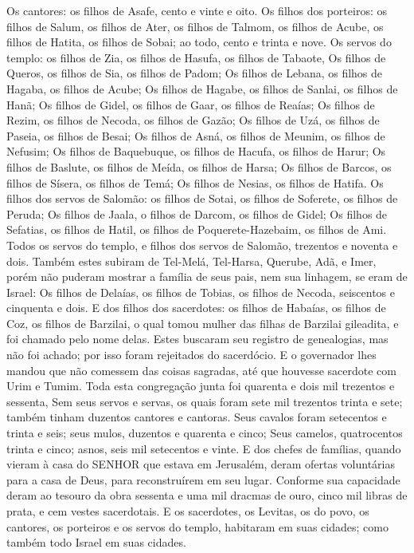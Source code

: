 {Os cantores: os filhos de Asafe, cento e vinte e oito.
Os filhos dos porteiros: os filhos de Salum, os filhos de Ater, os filhos de Talmom, os filhos de Acube, os filhos de Hatita, os filhos de Sobai; ao todo, cento e trinta e nove.
Os servos do templo:
 os filhos de Zia, os filhos de Hasufa, os filhos de Tabaote,
Os filhos de Queros, os filhos de Sia, os filhos de Padom;
Os filhos de Lebana, os filhos de Hagaba, os filhos de Acube;
Os filhos de Hagabe, os filhos de Sanlai, os filhos de Hanã;
Os filhos de Gidel, os filhos de Gaar, os filhos de Reaías;
Os filhos de Rezim, os filhos de Necoda, os filhos de Gazão;
Os filhos de Uzá, os filhos de Paseia, os filhos de Besai;
Os filhos de Asná, os filhos de Meunim, os filhos de Nefusim;
Os filhos de Baquebuque, os filhos de Hacufa, os filhos de Harur;
Os filhos de Baslute, os filhos de Meída, os filhos de Harsa;
Os filhos de Barcos, os filhos de Sísera, os filhos de Temá;
Os filhos de Nesias, os filhos de Hatifa.
Os filhos dos servos de Salomão: os filhos de Sotai, os filhos de Soferete, os filhos de Peruda;
Os filhos de Jaala, o filhos de Darcom, os filhos de Gidel;
Os filhos de Sefatias, os filhos de Hatil, os filhos de Poquerete-Hazebaim, os filhos de Ami.
Todos os servos do templo, e filhos dos servos de Salomão, trezentos e noventa e dois.
Também estes subiram de Tel-Melá, Tel-Harsa, Querube, Adã, e Imer, porém não puderam mostrar a família
 de seus pais, nem sua linhagem, se eram de Israel:
Os filhos de Delaías, os filhos de Tobias, os filhos de Necoda, seiscentos e cinquenta e dois.
E dos filhos dos sacerdotes: os filhos de Habaías, os filhos de Coz, os filhos de Barzilai, o qual tomou mulher das filhas de Barzilai gileadita, e foi chamado pelo nome delas.
Estes buscaram seu registro de genealogias, mas não foi achado; por isso foram rejeitados do sacerdócio.
E o governador lhes mandou que não comessem das coisas sagradas, até que houvesse sacerdote com Urim e Tumim.
Toda esta congregação junta foi quarenta e dois mil trezentos e sessenta,
Sem seus servos e servas, os quais foram sete mil trezentos trinta e sete; também tinham duzentos cantores e cantoras.
Seus cavalos foram setecentos e trinta e seis; seus mulos, duzentos e quarenta e cinco;
Seus camelos, quatrocentos trinta e cinco; asnos, seis mil setecentos e vinte.
E
{} dos chefes de famílias, quando vieram à casa do SENHOR que estava em Jerusalém, deram ofertas voluntárias para a casa de Deus, para
{} reconstruírem em seu lugar.
Conforme sua capacidade deram ao tesouro da obra sessenta e uma mil dracmas de ouro, cinco mil libras de prata, e cem vestes sacerdotais.
E os sacerdotes, os Levitas, os do povo, os cantores, os porteiros e os servos do templo, habitaram em suas cidades; como também todo Israel em suas cidades.

}
